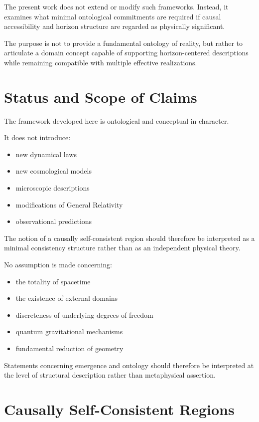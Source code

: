 \documentclass[12pt,a4paper]{article}
\begin{document}
The present work does not extend or modify such frameworks. Instead, it examines what minimal ontological commitments are required if causal accessibility and horizon structure are regarded as physically significant.

The purpose is not to provide a fundamental ontology of reality, but rather to articulate a domain concept capable of supporting horizon-centered descriptions while remaining compatible with multiple effective realizations.

\section{Status and Scope of Claims}

The framework developed here is ontological and conceptual in character.

It does not introduce:

\begin{itemize}
  \item new dynamical laws
  \item new cosmological models
  \item microscopic descriptions
  \item modifications of General Relativity
  \item observational predictions
\end{itemize}

The notion of a causally self-consistent region should therefore be interpreted as a minimal consistency structure rather than as an independent physical theory.

No assumption is made concerning:

\begin{itemize}
  \item the totality of spacetime
  \item the existence of external domains
  \item discreteness of underlying degrees of freedom
  \item quantum gravitational mechanisms
  \item fundamental reduction of geometry
\end{itemize}

Statements concerning emergence and ontology should therefore be interpreted at the level of structural description rather than metaphysical assertion.

\section{Causally Self-Consistent Regions}
\end{document}
